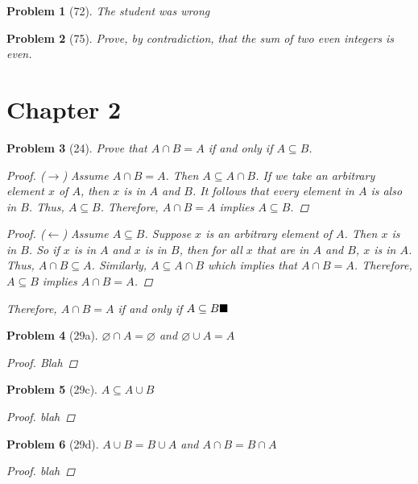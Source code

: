\documentclass{article}
\let\emptyset\varnothing
\theoremstyle{example}
\newtheorem{prob}{Problem}
\renewcommand{\qedsymbol}{$\blacksquare$}
\def\bs{\hspace{\stretch1}\ensuremath\blacksquare}
\begin{document}
\begin{prob}[72]
The student was wrong 
\end{prob}

\begin{prob}[75]
  Prove, by contradiction, that the sum of two even integers is even.
\end{prob}

\section*{Chapter 2}
\begin{prob}[24]
Prove that $A \cap B = A$ if and only if $A \subseteq B$.
\renewcommand\qedsymbol{}
\begin{proof}($\rightarrow$)
Assume $A \cap B = A$. Then $A \subseteq A \cap B$. If we take an arbitrary element $x$ of $A$, then $x$ is in $A$ and $B$. It follows that every element in $A$ is also in $B$. Thus, $A \subseteq B$. Therefore, $A \cap B = A$ implies $A \subseteq B$.
\end{proof}
\begin{proof}($\leftarrow$)
Assume $A \subseteq B$. Suppose $x$ is an arbitrary element of $A$. Then $x$ is in $B$. So if $x$ is in $A$ and $x$ is in $B$, then for all $x$ that are in $A$ and $B$, $x$ is in $A$. Thus, $A \cap B \subseteq A$. Similarly, $A \subseteq A \cap B$ which implies that $A \cap B = A$. Therefore, $A \subseteq B$ implies $A \cap B = A$.
\end{proof}
\renewcommand{\qedsymbol}{$\blacksquare$}
Therefore, $A \cap B = A$ if and only if $A \subseteq B\bs$
\end{prob}

\begin{prob}[29a]
$\emptyset \cap A = \emptyset$ and $\emptyset \cup A = A$
\begin{proof}
Blah
\end{proof}
\end{prob}

\begin{prob}[29c]
$A \subseteq A \cup B$
\begin{proof}
blah
\end{proof}
\end{prob}

\begin{prob}[29d]
$A \cup B = B \cup A$ and $A \cap B = B \cap A$
\begin{proof}
blah
\end{proof}
\end{prob}
\end{document}
